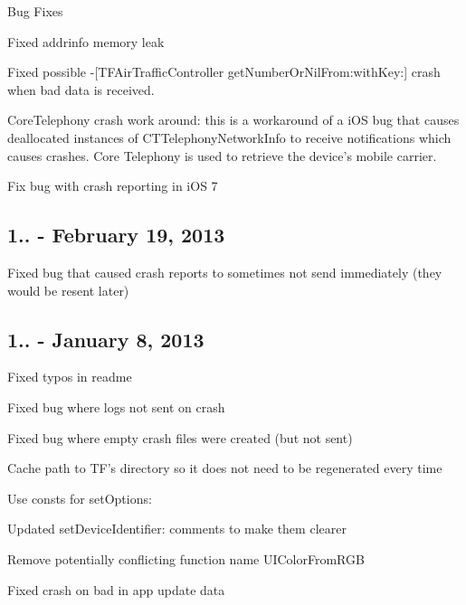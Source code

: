 Bug Fixes


\begin{DoxyItemize}
\item Fixed addrinfo memory leak
\item Fixed possible {\ttfamily -\/\mbox{[}T\-F\-Air\-Traffic\-Controller get\-Number\-Or\-Nil\-From\-:with\-Key\-:\mbox{]}} crash when bad data is received.
\item Core\-Telephony crash work around\-: this is a workaround of a i\-O\-S bug that causes deallocated instances of {\ttfamily C\-T\-Telephony\-Network\-Info} to receive notifications which causes crashes. Core Telephony is used to retrieve the device's mobile carrier.
\item Fix bug with crash reporting in i\-O\-S 7
\end{DoxyItemize}

\subsection*{1.. -\/ February 19, 2013}


\begin{DoxyItemize}
\item Fixed bug that caused crash reports to sometimes not send immediately (they would be resent later)
\end{DoxyItemize}

\subsection*{1.. -\/ January 8, 2013}


\begin{DoxyItemize}
\item Fixed typos in readme
\item Fixed bug where logs not sent on crash
\item Fixed bug where empty crash files were created (but not sent)
\item Cache path to T\-F's directory so it does not need to be regenerated every time
\item Use consts for {\ttfamily set\-Options\-:}
\item Updated {\ttfamily set\-Device\-Identifier\-:} comments to make them clearer
\item Remove potentially conflicting function name {\ttfamily U\-I\-Color\-From\-R\-G\-B}
\item Fixed crash on bad in app update data
\end{DoxyItemize}

